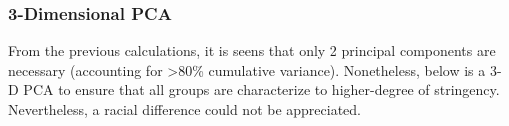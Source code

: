 \documentclass[
  10pt,
]{article}
\newenvironment{Shaded}{\begin{snugshade}}{\end{snugshade}}
\newcommand{\DocumentationTok}[1]{\textcolor[rgb]{0.56,0.35,0.01}{\textbf{\textit{#1}}}}
\newcommand{\FunctionTok}[1]{\textcolor[rgb]{0.00,0.00,0.00}{#1}}
\newcommand{\NormalTok}[1]{#1}
\newcommand{\OtherTok}[1]{\textcolor[rgb]{0.56,0.35,0.01}{#1}}
\newcommand{\SpecialCharTok}[1]{\textcolor[rgb]{0.00,0.00,0.00}{#1}}
\begin{document}
\hypertarget{dimensional-pca}{%
\subsubsection{3-Dimensional PCA}\label{dimensional-pca}}

From the previous calculations, it is seens that only 2 principal
components are necessary (accounting for \textgreater80\% cumulative
variance). Nonetheless, below is a 3-D PCA to ensure that all groups are
characterize to higher-degree of stringency. Nevertheless, a racial
difference could not be appreciated.

\begin{Shaded}
\end{Shaded}
\end{document}

